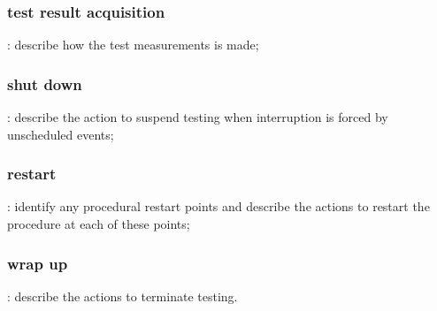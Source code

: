 \subsubsection{test result acquisition}
: describe how the test measurements is made;
\subsubsection{shut down}
: describe the action to suspend testing when interruption is forced by unscheduled events;
\subsubsection{restart}
: identify any procedural restart points and describe the actions to restart the procedure at each of these points;
\subsubsection{wrap up}
: describe the actions to terminate testing.